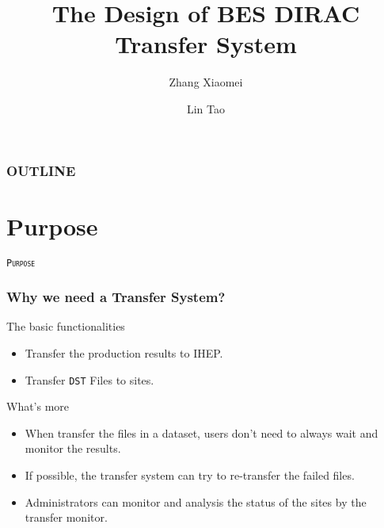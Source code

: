 \documentclass[19pt]{beamer}
\begin{document}
\title{The Design of BES DIRAC Transfer System}
\author{
    Zhang Xiaomei 
    \and
    Lin Tao 
}


\maketitle

\begin{frame}
    \frametitle{OUTLINE}
    \tableofcontents
\end{frame}


\section{Purpose}

\begin{frame}
    \begin{center}
        \LARGE \tt{{\textsc{Purpose}}}
    \end{center}
\end{frame}

\begin{frame}
    \frametitle{Why we need a Transfer System?}
    \begin{block}{The basic functionalities}
        \begin{itemize}
            \item Transfer the production results to IHEP.
            \item Transfer {\tt DST} Files to sites.
        \end{itemize}
    \end{block}
    \begin{block}{What's more}
        \begin{itemize}
            \item When transfer the files in a dataset, users
                  don't need to always wait and monitor the results.
            \item If possible, the transfer system can try to re-transfer
                  the failed files.
            \item Administrators can monitor and analysis the status of the 
                  sites by the transfer monitor.
        \end{itemize}
    \end{block}
\end{frame}
\end{document}
